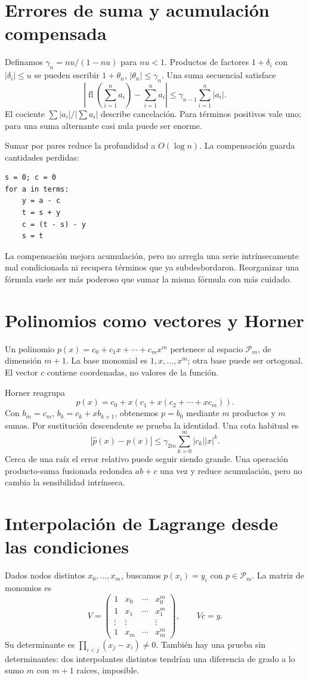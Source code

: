 \documentclass[11pt,a4paper]{article}
\theoremstyle{definition}
\DeclareMathOperator{\fl}{fl}
\begin{document}
\section{Errores de suma y acumulación compensada}
Definamos $\gamma_n=nu/(1-nu)$ para $nu<1$. Productos de factores $1+\delta_i$ con $|\delta_i|\le u$ se pueden escribir $1+\theta_n$, $|\theta_n|\le\gamma_n$. Una suma secuencial satisface
\[
\left|\fl\left(\sum_{i=1}^n a_i\right)-\sum_{i=1}^n a_i\right|
\le\gamma_{n-1}\sum_{i=1}^n|a_i|.
\]
El cociente $\sum|a_i|/|\sum a_i|$ describe cancelación. Para términos positivos vale uno; para una suma alternante casi nula puede ser enorme.

Sumar por pares reduce la profundidad a $O(\log n)$. La compensación guarda cantidades perdidas:
\begin{lstlisting}
s = 0; c = 0
for a in terms:
    y = a - c
    t = s + y
    c = (t - s) - y
    s = t
\end{lstlisting}
La compensación mejora acumulación, pero no arregla una serie intrínsecamente mal condicionada ni recupera términos que ya subdesbordaron. Reorganizar una fórmula suele ser más poderoso que sumar la misma fórmula con más cuidado.

\section{Polinomios como vectores y Horner}
Un polinomio $p(x)=c_0+c_1x+\cdots+c_mx^m$ pertenece al espacio $\mathcal P_m$, de dimensión $m+1$. La base monomial es $1,x,\ldots,x^m$; otra base puede ser ortogonal. El vector $c$ contiene coordenadas, no valores de la función.

Horner reagrupa
\[
p(x)=c_0+x(c_1+x(c_2+\cdots+xc_m)).
\]
Con $b_m=c_m$, $b_k=c_k+xb_{k+1}$, obtenemos $p=b_0$ mediante $m$ productos y $m$ sumas. Por sustitución descendente se prueba la identidad. Una cota habitual es
\[
|\widehat p(x)-p(x)|\le\gamma_{2m}\sum_{k=0}^m|c_k||x|^k.
\]
Cerca de una raíz el error relativo puede seguir siendo grande. Una operación producto-suma fusionada redondea $ab+c$ una vez y reduce acumulación, pero no cambia la sensibilidad intrínseca.

\section{Interpolación de Lagrange desde las condiciones}
Dados nodos distintos $x_0,\ldots,x_m$, buscamos $p(x_i)=y_i$ con $p\in\mathcal P_m$. La matriz de monomios es
\[
V=\begin{pmatrix}1&x_0&\cdots&x_0^m\\1&x_1&\cdots&x_1^m\\
\vdots&\vdots&&\vdots\\1&x_m&\cdots&x_m^m\end{pmatrix},\qquad Vc=y.
\]
Su determinante es $\prod_{i<j}(x_j-x_i)\ne0$. También hay una prueba sin determinantes: dos interpolantes distintos tendrían una diferencia de grado a lo sumo $m$ con $m+1$ raíces, imposible.
\end{document}
